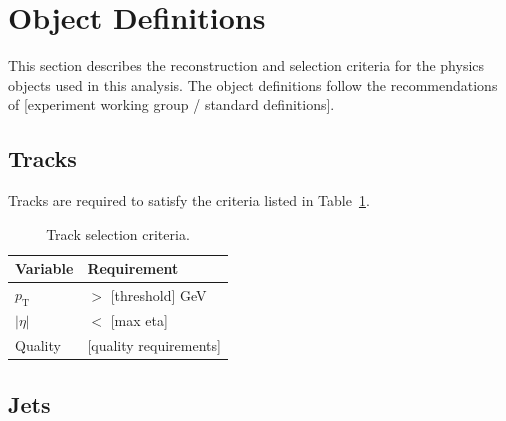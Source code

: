 
\section{Object Definitions}
\label{sec:objects}


This section describes the reconstruction and selection criteria for the
physics objects used in this analysis. The object definitions follow the
recommendations of [experiment working group / standard definitions].

\subsection{Tracks}
\label{sec:objects:tracks}


Tracks are required to satisfy the criteria listed in Table~\ref{tab:track_sel}.

\begin{table}[htbp]
  \centering
  \caption{Track selection criteria.}
  \label{tab:track_sel}
  \begin{tabular}{ll}
    \toprule
    Variable & Requirement \\
    \midrule
    $p_\text{T}$       & $>$ [threshold] GeV \\
    $|\eta|$            & $<$ [max eta] \\
    Quality             & [quality requirements] \\
    \bottomrule
  \end{tabular}
\end{table}

\subsection{Jets}
\label{sec:objects:jets}


